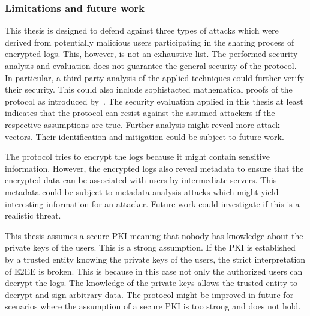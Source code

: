 \documentclass[../main.tex]{subfiles}
\begin{document}
\subsubsection{Limitations and future work}
This thesis is designed to defend against three types of attacks which were derived from potentially malicious users participating in the sharing process of encrypted logs.
This, however, is not an exhaustive list.
The performed security analysis and evaluation does not guarantee the general security of the protocol.
In particular, a third party analysis of the applied techniques could further verify their security.
This could also include sophistacted mathematical proofs of the protocol as introduced by~\cite{Katz2020}.   
The security evaluation applied in this thesis at least indicates that the protocol can resist against the assumed attackers if the respective assumptions are true.
Further analysis might reveal more attack vectors.
Their identification and mitigation could be subject to future work.

The protocol tries to encrypt the logs because it might contain sensitive information.
However, the encrypted logs also reveal metadata to ensure that the encrypted data can be associated with users by intermediate servers.
This metadata could be subject to metadata analysis attacks which might yield interesting information for an attacker.
Future work could investigate if this is a realistic threat.

This thesis assumes a secure PKI meaning that nobody has knowledge about the private keys of the users.
This is a strong assumption.
If the PKI is established by a trusted entity knowing the private keys of the users, the strict interpretation of E2EE is broken.
This is because in this case not only the authorized users can decrypt the logs.
The knowledge of the private keys allows the trusted entity to decrypt and sign arbitrary data.
The protocol might be improved in future for scenarios where the assumption of a secure PKI is too strong and does not hold.
\end{document}
